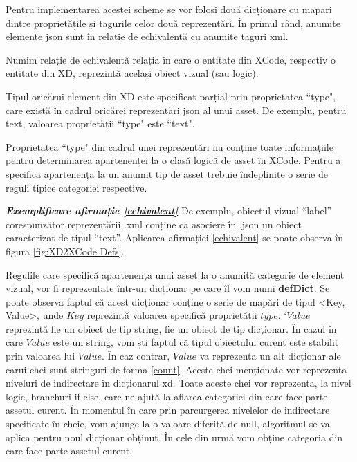 Pentru implementarea acestei scheme se vor folosi două dicționare cu mapari dintre proprietățile și tagurile celor două reprezentări. 
În primul rând, anumite elemente json sunt în relație de echivalentă cu anumite taguri xml. 
\\

\begin{mydef}\label{echivalent}
Numim relație de echivalentă relația în care o entitate din XCode, respectiv o entitate din XD, reprezintă același obiect vizual (sau logic).\\
\end{mydef}

\begin{myNote}\label{tip}
Tipul oricărui element din XD este specificat parțial prin proprietatea ``type", care există în cadrul oricărei reprezentări json al unui asset. De exemplu, pentru text, valoarea proprietății ``type" este ``text".\\
\end{myNote}

\begin{myNote}\label{echivalent}
Proprietatea ``type" din cadrul unei reprezentări nu conține toate informațiile pentru determinarea apartenenței la o clasă logică de asset în XCode. Pentru a specifica apartenența la un anumit tip de asset trebuie îndeplinite o serie de reguli tipice categoriei respective.\\
\end{myNote}

\textbf{\textit{Exemplificare afirmație \ref{echivalent}}} De exemplu, obiectul vizual “label” corespunzător reprezentării .xml conține ca asociere în .json un obiect caracterizat de tipul “text”. Aplicarea afirmației \ref{echivalent} se poate observa în figura \ref{fig:XD2XCode Defs}. 

Regulile care specifică apartenența unui asset la o anumită categorie de element vizual, vor fi reprezentate într-un dicționar pe care îl vom numi \textbf{defDict}. Se poate observa faptul că acest dicționar conține o serie de mapări de tipul <Key, Value>, unde $Key$ reprezintă valoarea specifică proprietății $type$. `$Value$ reprezintă fie un obiect de tip string, fie un obiect de tip dicționar. În cazul în care $Value$ este un string, vom ști faptul că tipul obiectului curent este stabilit prin valoarea lui $Value$. În caz contrar, $Value$ va reprezenta un alt dicționar ale carui chei sunt stringuri de forma \ref{count}. Aceste chei menționate vor reprezenta niveluri de indirectare în dicționarul xd. Toate aceste chei vor reprezenta, la nivel logic, branchuri if-else, care ne ajută la aflarea categoriei din care face parte assetul curent. În momentul în care prin parcurgerea nivelelor de indirectare specificate în cheie, vom ajunge la o valoare diferită de null, algoritmul se va aplica pentru noul dicționar obținut. În cele din urmă vom obține categoria din care face parte assetul curent. 

